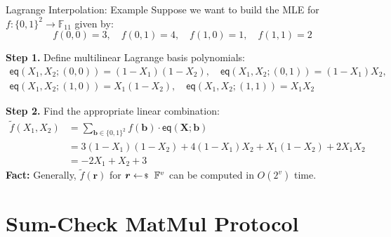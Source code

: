 \documentclass{zkdl-presentation-template}
\begin{document}
    \begin{frame}{Lagrange Interpolation: Example}
        Suppose we want to build the MLE for $f: \{0,1\}^2 \to \mathbb{F}_{11}$ given by:
        \begin{equation*}
            f(0,0) = 3, \quad f(0,1) = 4, \quad f(1,0) = 1, \quad f(1,1) = 2
        \end{equation*}
        
        \vspace{-10px}

        \pause\textcolor{oc-green-8}{\textbf{Step 1.}} Define multilinear Lagrange basis polynomials:
        \begin{gather*}
            \mathsf{eq}(X_1,X_2;(0,0)) = (1-X_1)(1-X_2), \quad \mathsf{eq}(X_1,X_2;(0,1)) = (1-X_1)X_2, \\
            \mathsf{eq}(X_1,X_2;(1,0)) = X_1(1-X_2), \quad \mathsf{eq}(X_1,X_2;(1,1)) = X_1X_2
        \end{gather*}

        \vspace{-10px}

        \pause\textcolor{oc-blue-8}{\textbf{Step 2.}} Find the appropriate linear combination:
        \begin{align*}
            \widetilde{f}(X_1,X_2) &= \sum_{\boldsymbol{b} \in \{0,1\}^2} f(\boldsymbol{b}) \cdot \mathsf{eq}(\mathbf{X};\boldsymbol{b}) \\
            &= 3(1-X_1)(1-X_2) + 4(1-X_1)X_2 + X_1(1-X_2) + 2X_1X_2 \\
            &= \boxed{-2X_1 + X_2 + 3}
        \end{align*}
        \pause\textbf{Fact:} Generally, $\widetilde{f}(\boldsymbol{r})$ for
        $\boldsymbol{r} \leftarrowS \mathbb{F}^v$ can be computed in
        $O(2^v)$ time.
    \end{frame}

    \section{Sum-Check MatMul Protocol}
\end{document}

